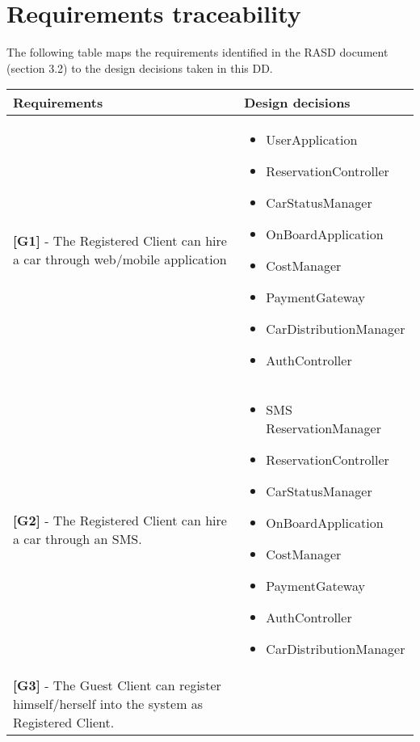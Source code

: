 \chapter{Requirements traceability}
The following table maps the requirements identified in the RASD document (section 3.2) to the design decisions taken in this DD.
\begin{longtable}{|l|l|}
\hline
Requirements & Design decisions \\ \hline
\begin{minipage}[t]{0.5\textwidth}
\textbf{[G1]} - The Registered Client can hire a car through web/mobile application
\end{minipage} &
\begin{minipage}[t]{0.45\textwidth}
\begin{itemize}
\item UserApplication
\item ReservationController
\item CarStatusManager
\item OnBoardApplication
\item CostManager
\item PaymentGateway
\item CarDistributionManager
\item AuthController
\end{itemize}
\end{minipage} \\ \hline
\begin{minipage}[t]{0.5\textwidth}
\textbf{[G2]} - The Registered Client can hire a car through an SMS.
\end{minipage} &
\begin{minipage}[t]{0.45\textwidth}
\begin{itemize}
\item SMS ReservationManager
\item ReservationController
\item CarStatusManager
\item OnBoardApplication
\item CostManager
\item PaymentGateway
\item AuthController
\item CarDistributionManager
\end{itemize}
\end{minipage} \\ \hline
\begin{minipage}[t]{0.5\textwidth}
\textbf{[G3]} - The Guest Client can register himself/herself into the system as Registered Client.

\end{minipage}
\end{longtable}
